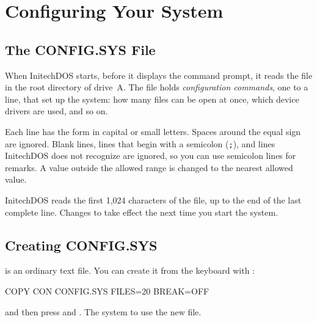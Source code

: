 \chapter{Configuring Your System}

\section{The CONFIG.SYS File}
When InitechDOS starts, before it displays the command prompt, it reads the
file  in the root directory of drive~A.  The file holds
\emph{configuration commands}, one to a line, that set up the system: how
many files can be open at once, which device drivers are used, and so on.

Each line has the form
in capital or small letters.  Spaces around the equal sign are ignored.
Blank lines, lines that begin with a semicolon (\texttt{;}), and lines
InitechDOS does not recognize are ignored, so you can use semicolon lines
for remarks.  A value outside the allowed range is changed to the nearest
allowed value.

InitechDOS reads the first 1,024 characters of the file, up to the end of
the last complete line.  Changes to  take effect the next
time you start the system.

\section{Creating CONFIG.SYS}
 is an ordinary text file.  You can create it from the
keyboard with :
\begin{TypeIn}
COPY CON CONFIG.SYS
FILES=20
BREAK=OFF
\end{TypeIn}
and then press  and .  The system 
to use the new file.

